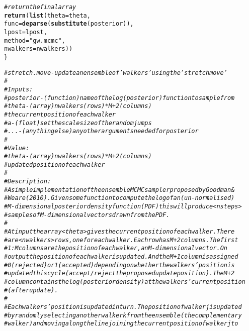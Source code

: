 \documentclass{article}\usepackage[]{graphicx}\usepackage[]{color}
\makeatletter
\newcommand{\hlstr}[1]{\textcolor[rgb]{0.192,0.494,0.8}{#1}}%
\newcommand{\hlcom}[1]{\textcolor[rgb]{0.678,0.584,0.686}{\textit{#1}}}%
\newcommand{\hlstd}[1]{\textcolor[rgb]{0.345,0.345,0.345}{#1}}%
\newcommand{\hlkwc}[1]{\textcolor[rgb]{0.333,0.667,0.333}{#1}}%
\newcommand{\hlkwd}[1]{\textcolor[rgb]{0.737,0.353,0.396}{\textbf{#1}}}%
\newenvironment{kframe}{%
 \def\at@end@of@kframe{}%
 \ifinner\ifhmode%
  \def\at@end@of@kframe{\end{minipage}}%
  \begin{minipage}{\columnwidth}%
 \fi\fi%
 \def\FrameCommand##1{\hskip\@totalleftmargin \hskip-\fboxsep
 \colorbox{shadecolor}{##1}\hskip-\fboxsep
     \hskip-\linewidth \hskip-\@totalleftmargin \hskip\columnwidth}%
 \MakeFramed {\advance\hsize-\width
   \@totalleftmargin\z@ \linewidth\hsize
   \@setminipage}}%
 {\par\unskip\endMakeFramed%
 \at@end@of@kframe}
\newenvironment{knitrout}{}{} %
\makeatother
\begin{document}
\begin{knitrout}
\begin{kframe}
\begin{alltt}
  \hlcom{# return the final array}
  \hlkwd{return}\hlstd{(}\hlkwd{list}\hlstd{(}\hlkwc{theta} \hlstd{= theta,}
              \hlkwc{func} \hlstd{=} \hlkwd{deparse}\hlstd{(}\hlkwd{substitute}\hlstd{(posterior)),}
              \hlkwc{lpost} \hlstd{= lpost,}
              \hlkwc{method} \hlstd{=} \hlstr{"gw.mcmc"}\hlstd{,}
              \hlkwc{nwalkers} \hlstd{= nwalkers))}
\hlstd{\}}
\end{alltt}
\end{kframe}
\end{knitrout}
\begin{knitrout}
\color{fgcolor}\begin{kframe}
\begin{alltt}
\hlcom{# stretch.move - update an ensemble of 'walkers' using the 'stretch move'}
\hlcom{#}
\hlcom{# Inputs: }
\hlcom{#   posterior  - (function) name of the log(posterior) function to sample from}
\hlcom{#   theta      - (array) nwalkers (rows) * M+2 (columns) }
\hlcom{#                  the current position of each walker}
\hlcom{#   a          - (float) set the scale size of the random jumps }
\hlcom{#   ...        - (anything else) any other arguments needed for posterior }
\hlcom{#}
\hlcom{# Value:}
\hlcom{#   theta     - (array) nwalkers (rows) * M+2 (columns) }
\hlcom{#                  updated position of each walker}
\hlcom{#}
\hlcom{# Description: }
\hlcom{# A simple implementation of the ensemble MCMC sampler proposed by Goodman &}
\hlcom{# Weare (2010). Given some function to compute the log of an (un-normalised)}
\hlcom{# M-dimensional posterior density function (PDF) this will produce <nsteps>}
\hlcom{# samples of M-dimensional vectors drawn from the PDF.}
\hlcom{# }
\hlcom{# At input the array <theta> gives the current position of each walker. There }
\hlcom{# are <nwalkers> rows, one for each walker. Each row has M+2 columns. The first }
\hlcom{# 1:M columns are the position of each walker, an M-dimensional vector. On }
\hlcom{# output the position of each walker is updated. And the M+1 column is assigned }
\hlcom{# 0 (rejected) or 1 (accepted) depending on whether the walkers' position is }
\hlcom{# updated this cycle (accept/reject the proposed update position). The M+2 }
\hlcom{# column contains the log(posterior density) at the walkers' current position }
\hlcom{# (after update).}
\hlcom{# }
\hlcom{# Each walkers' position is updated in turn. The position of walker j is updated}
\hlcom{# by randomly selecting another walker k from the ensemble (the complementary }
\hlcom{# walker) and moving along the line joining the current position of walker j to }

\end{alltt}
\end{kframe}
\end{knitrout}
\end{document}
